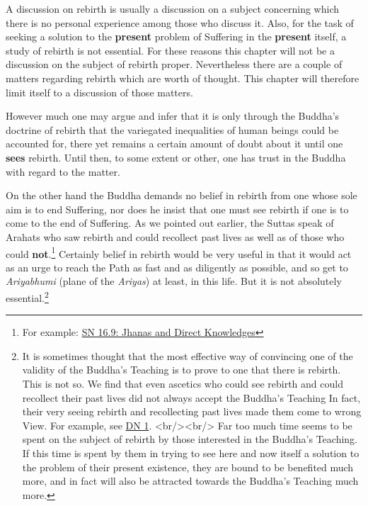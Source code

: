 A discussion on rebirth is usually a discussion on a subject concerning
which there is no personal experience among those who discuss it. Also,
for the task of seeking a solution to the \textbf{present} problem of Suffering
in the \textbf{present} itself, a study of rebirth is not essential. For these
reasons this chapter will not be a discussion on the subject of rebirth
proper. Nevertheless there are a couple of matters regarding rebirth
which are worth of thought. This chapter will therefore limit itself to
a discussion of those matters.


However much one may argue and infer that it is only through the
Buddha’s doctrine of rebirth that the variegated inequalities of human
beings could be accounted for, there yet remains a certain amount of
doubt about it until one \textbf{sees} rebirth. Until then, to some extent or
other, one has trust in the Buddha with regard to the matter.


On the other hand the Buddha demands no belief in rebirth from one whose
sole aim is to end Suffering, nor does he insist that one must see
rebirth if one is to come to the end of Suffering. As we pointed out
earlier, the Suttas speak of Arahats who saw rebirth and could
recollect past lives as well as of those who could \textbf{not}.\footnote{For example: \href{https://suttacentral.net/sn16.9/en/bodhi}{SN 16.9: Jhanas and Direct Knowledges}}
Certainly belief in rebirth would be very useful in that it would act as an urge
to reach the Path as fast and as diligently as possible, and so get to
\emph{Ariyabhumi} (plane of the \emph{Ariyas}) at least, in this life. But it is
not absolutely essential.\footnote{It is sometimes thought that the most effective way of convincing one of the validity of the Buddha’s Teaching is to prove to one that there is rebirth. This is not so. We find that even ascetics who could see rebirth and could recollect their past lives did not always accept the Buddha’s Teaching In fact, their very seeing rebirth and recollecting past lives made them come to wrong View. For example, see \href{https://suttacentral.net/dn1/en/bodhi}{DN 1}. <br/><br/> Far too much time seems to be spent on the subject of rebirth by those interested in the Buddha’s Teaching. If this time is spent by them in trying to see here and now itself a solution to the problem of their present existence, they are bound to be benefited much more, and in fact will also be attracted towards the Buddha’s Teaching much more.}


